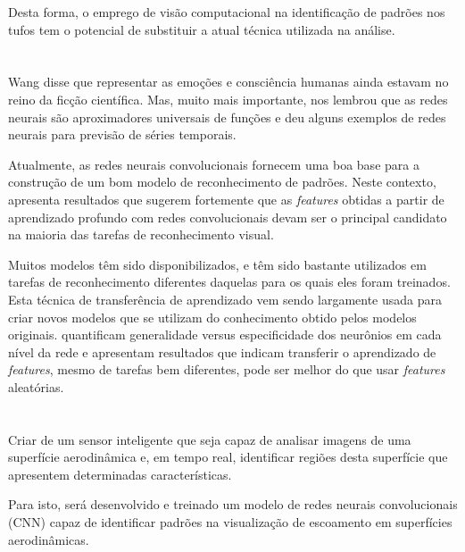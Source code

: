 \documentclass[12pt, a4paper]{article}
\begin{document}
Desta forma, o emprego de visão computacional na identificação de padrões nos tufos tem o potencial de substituir a atual técnica utilizada na análise.

\section{\sectionII}
\label{sec:rel-work}

Wang \cite{Wang2003} disse que representar as emoções e consciência humanas ainda estavam no reino da ficção científica. Mas, muito mais importante, nos lembrou que as redes neurais são aproximadores universais de funções e deu alguns exemplos de redes neurais para previsão de séries temporais.

Atualmente, as redes neurais convolucionais fornecem uma boa base para a construção de um bom modelo de reconhecimento de padrões. Neste contexto, \cite{arxiv.1403.6382} apresenta resultados que sugerem fortemente que as \emph{features} obtidas a partir de aprendizado profundo com redes convolucionais devam ser o principal candidato na maioria das tarefas de reconhecimento visual.

Muitos modelos têm sido disponibilizados, e têm sido bastante utilizados em tarefas de reconhecimento diferentes daquelas para os quais eles foram treinados. Esta técnica de transferência de aprendizado vem sendo largamente usada para criar novos modelos que se utilizam do conhecimento obtido pelos modelos originais. \cite{arxiv.1411.1792} quantificam generalidade versus especificidade dos neurônios em cada nível da rede e apresentam resultados que indicam transferir o aprendizado de \emph{features}, mesmo de tarefas bem diferentes, pode ser melhor do que usar \emph{features} aleatórias.


\section{\sectionIII}
\label{sec:goal}
Criar de um sensor inteligente que seja capaz de analisar imagens de uma superfície aerodinâmica e, em tempo real, identificar regiões desta superfície que apresentem determinadas características.

Para isto, será desenvolvido e treinado um modelo de redes neurais convolucionais (CNN) capaz de identificar padrões na visualização de escoamento em superfícies aerodinâmicas.
\end{document}
